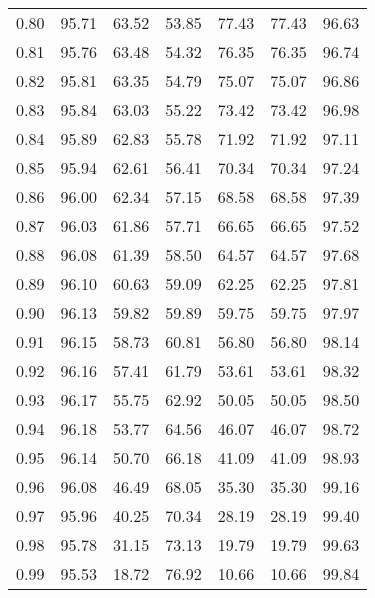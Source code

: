 \begin{tabular}{|c|c|c|c|c|c|c|}
      0.80 &     95.71 &     63.52 &      53.85 &   77.43 &      77.43 &         96.63 \\
      0.81 &     95.76 &     63.48 &      54.32 &   76.35 &      76.35 &         96.74 \\
      0.82 &     95.81 &     63.35 &      54.79 &   75.07 &      75.07 &         96.86 \\
      0.83 &     95.84 &     63.03 &      55.22 &   73.42 &      73.42 &         96.98 \\
      0.84 &     95.89 &     62.83 &      55.78 &   71.92 &      71.92 &         97.11 \\
      0.85 &     95.94 &     62.61 &      56.41 &   70.34 &      70.34 &         97.24 \\
      0.86 &     96.00 &     62.34 &      57.15 &   68.58 &      68.58 &         97.39 \\
      0.87 &     96.03 &     61.86 &      57.71 &   66.65 &      66.65 &         97.52 \\
      0.88 &     96.08 &     61.39 &      58.50 &   64.57 &      64.57 &         97.68 \\
      0.89 &     96.10 &     60.63 &      59.09 &   62.25 &      62.25 &         97.81 \\
      0.90 &     96.13 &     59.82 &      59.89 &   59.75 &      59.75 &         97.97 \\
      0.91 &     96.15 &     58.73 &      60.81 &   56.80 &      56.80 &         98.14 \\
      0.92 &     96.16 &     57.41 &      61.79 &   53.61 &      53.61 &         98.32 \\
      0.93 &     96.17 &     55.75 &      62.92 &   50.05 &      50.05 &         98.50 \\
      0.94 &     96.18 &     53.77 &      64.56 &   46.07 &      46.07 &         98.72 \\
      0.95 &     96.14 &     50.70 &      66.18 &   41.09 &      41.09 &         98.93 \\
      0.96 &     96.08 &     46.49 &      68.05 &   35.30 &      35.30 &         99.16 \\
      0.97 &     95.96 &     40.25 &      70.34 &   28.19 &      28.19 &         99.40 \\
      0.98 &     95.78 &     31.15 &      73.13 &   19.79 &      19.79 &         99.63 \\
      0.99 &     95.53 &     18.72 &      76.92 &   10.66 &      10.66 &         99.84 \\
\bottomrule
\end{tabular}
